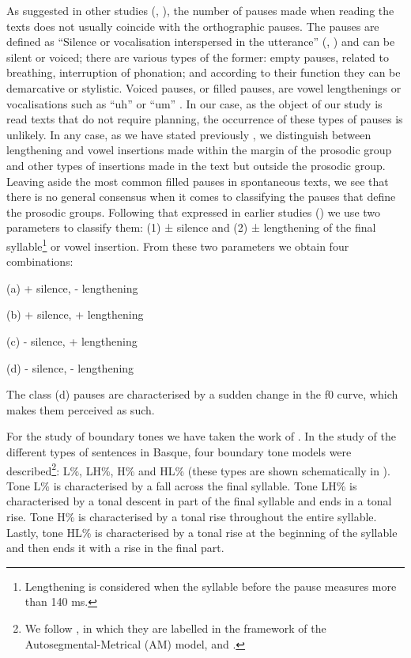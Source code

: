 \documentclass[output=paper]{langsci/langscibook}
\begin{document}
As suggested in other studies (\citealt[338]{Miller.2008}, \citealt{Gaminde.2010}), the number of pauses made when reading the texts does not usually coincide with the orthographic pauses. The pauses are defined as “Silence or vocalisation interspersed in the utterance” (\citealt[544]{Gil.2007}, \citealt{Canepari.2007}) and can be silent or voiced; there are various types of the former: empty pauses, related to breathing, interruption of phonation; and according to their function they can be demarcative or stylistic. Voiced pauses, or filled pauses, are vowel lengthenings or vocalisations such as “uh” or “um” \citep{Llisterri2013}. In our case, as the object of our study is read texts that do not require planning, the occurrence of these types of pauses is unlikely. In any case, as we have stated previously  \citep{Gaminde.2010,Gaminde.2015}, we distinguish between lengthening and vowel insertions made within the margin of the prosodic group and other types of insertions made in the text but outside the prosodic group. Leaving aside the most common filled pauses in spontaneous texts, we see that there is no general consensus when it comes to classifying the pauses that define the prosodic groups. Following that expressed in earlier studies (\citealt{Gaminde.2010,Gaminde.2012,Gaminde.2015}) we use two parameters to classify them: (1) ± silence and (2) ± lengthening of the final syllable\footnote{Lengthening is considered when the syllable before the pause measures more than 140 ms.} or vowel insertion. From these two parameters we obtain four combinations:

(a)  + silence, - lengthening

(b)   + silence, + lengthening

(c)  - silence, + lengthening

(d)  - silence, - lengthening

  The class (d) pauses are characterised by a sudden change in the f0 curve, which makes them perceived as such. 

  For the study of boundary tones we have taken the work of \citet{Gaminde.2016}. In the study of the different types of sentences in Basque, four boundary tone models were described\footnote{We follow \citet{Ladd.1996}, in which they are labelled in the framework of the Autosegmental-Metrical (AM) model, and \citet{Prieto.2003}.}: L\%, LH\%, H\% and HL\% (these types are shown schematically in ). Tone L\% is characterised by a fall across the final syllable. Tone LH\% is characterised by a tonal descent in part of the final syllable and ends in a tonal rise. Tone H\% is characterised by a tonal rise throughout the entire syllable. Lastly, tone HL\% is characterised by a tonal rise at the beginning of the syllable and then ends it with a rise in the final part.
\end{document}
